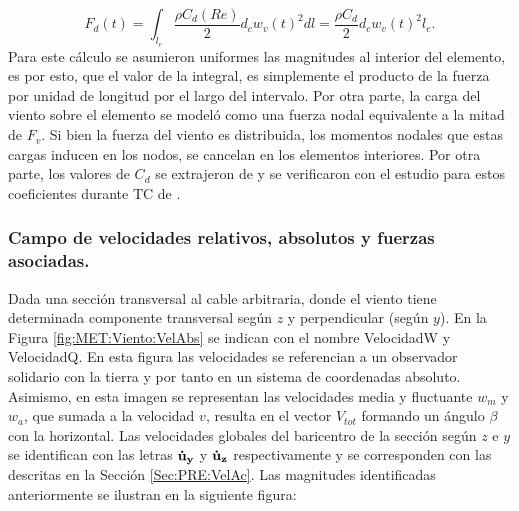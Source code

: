 \begin{equation}
	\label{Eq:MET:FuerzaViento}
	F_d(t)=\int_{l_e}\frac{\rho C_d(Re)}{2}{d_c w_v(t)^2} dl= \frac{\rho C_d}{2}d_c w_v(t)^2l_{e}.
\end{equation}
Para este cálculo se asumieron uniformes las magnitudes al interior del elemento, es por esto, que el valor de la integral, es simplemente el producto de la fuerza por unidad de longitud por el largo del intervalo. Por otra parte, la carga del viento sobre el elemento se modeló como una fuerza nodal equivalente a la mitad de $F_v$. Si bien la fuerza del viento es distribuida, los momentos nodales que estas cargas inducen en los nodos, se cancelan en los elementos interiores. Por otra parte, los valores de $C_d$ se extrajeron de \citep{Foti2016} y se verificaron con el estudio para estos coeficientes durante TC de \citep{mara2007effects}. 

\subsubsection{Campo de velocidades relativos, absolutos y fuerzas asociadas.}\label{SubSec:MET:CampoVelRealt}
Dada una sección transversal al cable arbitraria, donde el viento tiene determinada componente transversal según $z$ y perpendicular (según $y$). En la Figura \ref{fig:MET:Viento:VelAbs} se indican con el nombre \gls{VelocidadW} y \gls{VelocidadQ}. En esta figura las velocidades se referencian a un observador solidario con la tierra y por tanto en un sistema de coordenadas absoluto. Asimismo, en esta imagen se representan las velocidades media y fluctuante $w_m$ y $w_a$, que sumada a la velocidad $v$, resulta en el vector $V_{tot}$ formando un ángulo $\beta$ con la horizontal. Las velocidades globales del baricentro de la sección según $z$ e $y$ se identifican con las letras $\bf{\dot{u}}_{y}$ y $\bf{\dot{u}}_{z}$ respectivamente y se corresponden con las descritas en la Sección \ref{Sec:PRE:VelAc}. Las magnitudes identificadas anteriormente se ilustran en la siguiente figura:
% 

